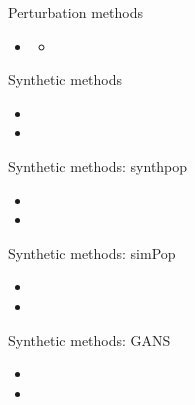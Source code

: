 \documentclass[
  ignorenonframetext,
  aspectratio=169,
]{beamer}
\begin{document}
\begin{frame}{Perturbation methods}
\protect\hypertarget{perturbation-methods}{}
\begin{itemize}
\item
  \begin{itemize}
  \item
    \color{red}{sdcMicro}
  \end{itemize}
\end{itemize}
\end{frame}

\begin{frame}{Synthetic methods}
\protect\hypertarget{synthetic-methods}{}
\begin{itemize}
\item
  \color{red}{Introduction to synthetic data}
\item
  \Huge \color{red}{for Jiri/Oscar}
\end{itemize}
\end{frame}

\begin{frame}{Synthetic methods: synthpop}
\protect\hypertarget{synthetic-methods-synthpop}{}
\begin{itemize}
\item
  \color{red}{Generating synthetic data with synthpop}
\item
  \Huge \color{red}{for Jiri/Oscar}
\end{itemize}
\end{frame}

\begin{frame}{Synthetic methods: simPop}
\protect\hypertarget{synthetic-methods-simpop}{}
\begin{itemize}
\item
  \color{red}{Generating synthetic data with simPop}
\item
  \Huge \color{red}{for Jiri/Oscar}
\end{itemize}
\end{frame}

\begin{frame}{Synthetic methods: GANS}
\protect\hypertarget{synthetic-methods-gans}{}
\begin{itemize}
\item
  \color{red}{Generating synthetic data with GANs}
\item
  \Huge \color{red}{for Marco}
\end{itemize}
\end{frame}
\end{document}
